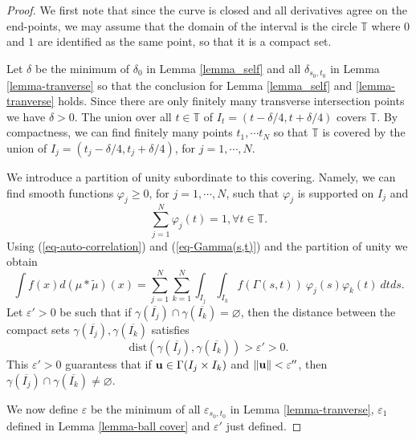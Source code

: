\documentclass[12pt,a4paper,oneside]{amsart}
\theoremstyle{definition}
\newcommand{\wt}[1]{\widetilde{#1}}
\begin{document}
\begin{proof}
We first note that {since the} curve is closed and all derivatives agree on the end-points, we may assume that the domain of the interval is the circle ${\mathbb T}$ where $0$ and $1$ are identified as the same point, so that it is a compact set.


    Let $\delta$ be the minimum of $\delta_0$ in Lemma \ref{lemma_self} and all $\delta_{s_0,t_0}$ in Lemma \ref{lemma-tranverse} so that the conclusion for Lemma \ref{lemma_self} and \ref{lemma-tranverse} holds. Since there are only finitely many transverse intersection points {we have} $\delta>0$.  {The union over} all $t\in {\mathbb T}$ {of} $I_t = (t-\delta/4,t+\delta/4)$ covers ${\mathbb T}$. By compactness, we can find finitely many points $t_1,\cdots t_N$ so that ${\mathbb T}$ is covered by {the union of} $I_j = (t_j-\delta/4,t_j+\delta/4)$, {for} $j=1,\cdots, N$. 

     {We introduce a partition of unity subordinate to this covering.} Namely, we can find smooth functions $\varphi_j{\ge 0}$, for $j = 1,\cdots,N$, such that $\varphi_j$ is supported on $I_j$ and 
     $$
     \sum_{j=1}^N \varphi_j(t) = 1, \forall t\in {\mathbb T}.
     $$
Using (\ref{eq-auto-correlation}) and (\ref{eq-Gamma(s,t)}) and the partition of unity {we obtain}
\begin{equation}\label{eq-partition-unity}
\int f(x)d(\mu\ast\wt{\mu})(x) = \sum_{j=1}^N\sum_{k=1}^N\int_{I_j}\int_{I_k} f(\Gamma(s,t))~\varphi_j(s)\varphi_k(t)~dtds.
\end{equation}
Let $\varepsilon'>0$ be such that if $\gamma(\overline{I_j})\cap \gamma(\overline{I_k}) = \varnothing$, then the distance between the compact sets $\gamma(\overline{I_j}), \gamma(\overline{I_k})$ {satisfies}
$$
\mbox{dist} (\gamma(\overline{I_j}), \gamma(\overline{I_k})) >\varepsilon'>0.
$$
This $\varepsilon'>0$ guarantess that if ${\bf u}\in \Gamma(I_j\times I_k)$ and $\|{\bf u}\|<\varepsilon''$, then $\gamma(\overline{I_j})\cap \gamma(\overline{I_k}) \ne  \varnothing$. 

We now define $\varepsilon$ be the minimum of all $\varepsilon_{s_0,t_0}$ in Lemma {\ref{lemma-tranverse}},  {$\varepsilon_1$} defined in Lemma \ref{lemma-ball cover} and $\varepsilon'$ just defined. 



\end{proof}
\end{document}
